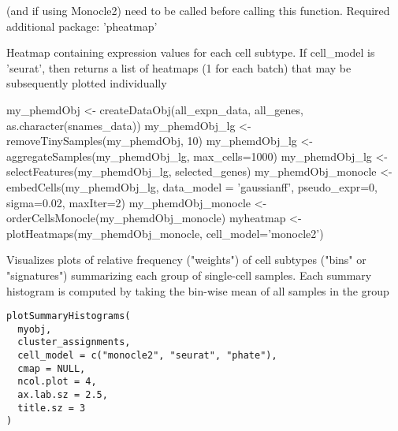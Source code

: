 \documentclass[a4paper]{book}
\begin{document}
%
\begin{Details}\relax
{} (and  if using Monocle2) need to be called before calling this function. Required additional package: 'pheatmap'
\end{Details}
%
\begin{Value}
Heatmap containing expression values for each cell subtype. If cell\_model is 'seurat', then returns a list of heatmaps (1 for each batch) that may be subsequently plotted individually
\end{Value}
%
\begin{Examples}
\begin{ExampleCode}

my_phemdObj <- createDataObj(all_expn_data, all_genes, as.character(snames_data))
my_phemdObj_lg <- removeTinySamples(my_phemdObj, 10)
my_phemdObj_lg <- aggregateSamples(my_phemdObj_lg, max_cells=1000)
my_phemdObj_lg <- selectFeatures(my_phemdObj_lg, selected_genes)
my_phemdObj_monocle <- embedCells(my_phemdObj_lg, data_model = 'gaussianff',
pseudo_expr=0, sigma=0.02, maxIter=2)
my_phemdObj_monocle <- orderCellsMonocle(my_phemdObj_monocle)
myheatmap <- plotHeatmaps(my_phemdObj_monocle, cell_model='monocle2')

\end{ExampleCode}
\end{Examples}
%
\begin{Description}\relax
Visualizes plots of relative frequency ("weights") of cell subtypes ("bins" or "signatures") summarizing each group of single-cell samples. Each summary histogram is computed by taking the bin-wise mean of all samples in the group
\end{Description}
%
\begin{Usage}
\begin{verbatim}
plotSummaryHistograms(
  myobj,
  cluster_assignments,
  cell_model = c("monocle2", "seurat", "phate"),
  cmap = NULL,
  ncol.plot = 4,
  ax.lab.sz = 2.5,
  title.sz = 3
)
\end{verbatim}
\end{Usage}
%
\end{document}
